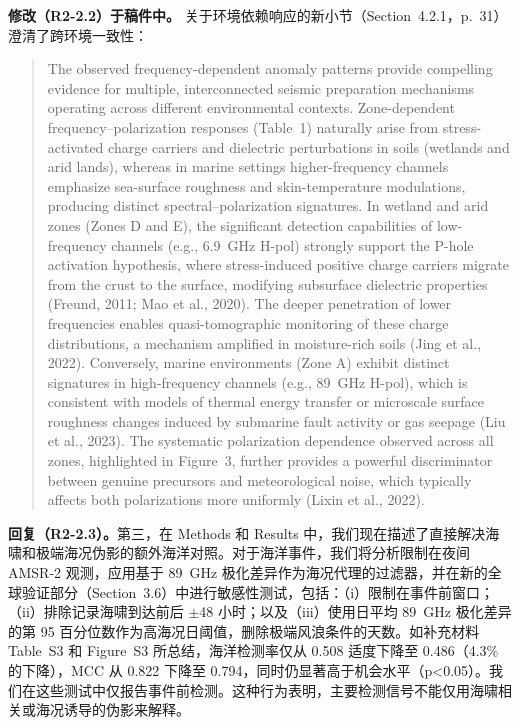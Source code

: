 \documentclass[12pt]{article}
\newcommand{\revresponse}[1]{\begingroup\color{responsecolor}#1\endgroup}
\newcommand{\revchange}[1]{\begingroup\color{changecolor}#1\endgroup}
\begin{document}
\revchange{%
\textbf{修改（R2-2.2）于稿件中。}
关于环境依赖响应的新小节（Section~4.2.1，p.~31）澄清了跨环境一致性：

\begin{quote}
The observed frequency-dependent anomaly patterns provide compelling evidence for multiple, interconnected seismic preparation mechanisms operating across different environmental contexts. Zone-dependent frequency--polarization responses (Table~1) naturally arise from stress-activated charge carriers and dielectric perturbations in soils (wetlands and arid lands), whereas in marine settings higher-frequency channels emphasize sea-surface roughness and skin-temperature modulations, producing distinct spectral--polarization signatures. In wetland and arid zones (Zones D and E), the significant detection capabilities of low-frequency channels (e.g., 6.9~GHz H-pol) strongly support the P-hole activation hypothesis, where stress-induced positive charge carriers migrate from the crust to the surface, modifying subsurface dielectric properties (Freund, 2011; Mao et al., 2020). The deeper penetration of lower frequencies enables quasi-tomographic monitoring of these charge distributions, a mechanism amplified in moisture-rich soils (Jing et al., 2022). Conversely, marine environments (Zone A) exhibit distinct signatures in high-frequency channels (e.g., 89~GHz H-pol), which is consistent with models of thermal energy transfer or microscale surface roughness changes induced by submarine fault activity or gas seepage (Liu et al., 2023). The systematic polarization dependence observed across all zones, highlighted in Figure~3, further provides a powerful discriminator between genuine precursors and meteorological noise, which typically affects both polarizations more uniformly (Lixin et al., 2022).
\end{quote}
}

\revresponse{%
\textbf{回复（R2-2.3）。}第三，在 Methods 和 Results 中，我们现在描述了直接解决海啸和极端海况伪影的额外海洋对照。对于海洋事件，我们将分析限制在夜间 AMSR-2 观测，应用基于 89~GHz 极化差异作为海况代理的过滤器，并在新的全球验证部分（Section~3.6）中进行敏感性测试，包括：（i）限制在事件前窗口；（ii）排除记录海啸到达前后 $\pm$48 小时；以及（iii）使用日平均 89~GHz 极化差异的第 95 百分位数作为高海况日阈值，删除极端风浪条件的天数。如补充材料 Table~S3 和 Figure~S3 所总结，海洋检测率仅从 0.508 适度下降至 0.486（4.3\% 的下降），MCC 从 0.822 下降至 0.794，同时仍显著高于机会水平（p<0.05）。我们在这些测试中仅报告事件前检测。这种行为表明，主要检测信号不能仅用海啸相关或海况诱导的伪影来解释。
}
\end{document}
